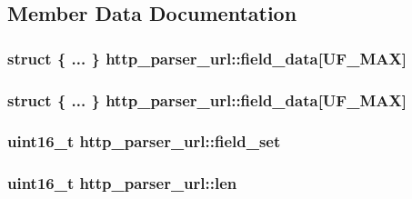 \subsection{Member Data Documentation}
\hypertarget{structhttp__parser__url_a7a13fbad518cfd159eaba777f202150a}{}
\subsubsection[{field\+\_\+data}]{\setlength{\rightskip}{0pt plus 5cm}struct \{ ... \}  http\+\_\+parser\+\_\+url\+::field\+\_\+data\mbox{[}{\bf U\+F\+\_\+\+M\+A\+X}\mbox{]}}\label{structhttp__parser__url_a7a13fbad518cfd159eaba777f202150a}
\hypertarget{structhttp__parser__url_abbbd8851df7a76adb38e7eea4c51840c}{}
\subsubsection[{field\+\_\+data}]{\setlength{\rightskip}{0pt plus 5cm}struct \{ ... \}   http\+\_\+parser\+\_\+url\+::field\+\_\+data\mbox{[}{\bf U\+F\+\_\+\+M\+A\+X}\mbox{]}}\label{structhttp__parser__url_abbbd8851df7a76adb38e7eea4c51840c}
\hypertarget{structhttp__parser__url_a77af61a480f11c41938810dd76ca49eb}{}
\subsubsection[{field\+\_\+set}]{\setlength{\rightskip}{0pt plus 5cm}uint16\+\_\+t http\+\_\+parser\+\_\+url\+::field\+\_\+set}\label{structhttp__parser__url_a77af61a480f11c41938810dd76ca49eb}
\hypertarget{structhttp__parser__url_a60fb784a989dd5a95e5bd19d468d22c7}{}
\subsubsection[{len}]{\setlength{\rightskip}{0pt plus 5cm}uint16\+\_\+t http\+\_\+parser\+\_\+url\+::len}\label{structhttp__parser__url_a60fb784a989dd5a95e5bd19d468d22c7}
\hypertarget{structhttp__parser__url_a6510826f3aa9a1100ac5f714323edeb1}{}
